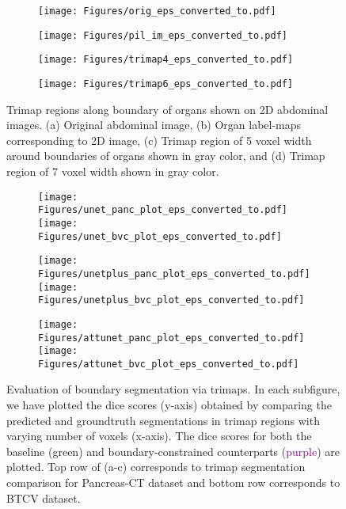 \documentclass[final,5p,times,twocolumn]{elsarticle}
\begin{document}
\begin{figure}[!hbt]
\begin{subfigure}[b]{.23\textwidth}
\texttt{[image: Figures/orig\_eps\_converted\_to.pdf]} 
\caption{}
\label{fig:origtrimap}
\end{subfigure}
\begin{subfigure}[b]{.23\textwidth}
\texttt{[image: Figures/pil\_im\_eps\_converted\_to.pdf]}
\caption{}
\label{fig:labelmap}
\end{subfigure}
\begin{subfigure}[b]{.23\textwidth}
\texttt{[image: Figures/trimap4\_eps\_converted\_to.pdf]}
\caption{}
\label{fig:trmap4}
\end{subfigure}
\begin{subfigure}[b]{.23\textwidth}
\texttt{[image: Figures/trimap6\_eps\_converted\_to.pdf]}
\caption{}
\label{fig:trmap6}
\end{subfigure}
\caption{Trimap regions along boundary of organs shown on 2D abdominal images. (a) Original abdominal image, (b) Organ label-maps corresponding to 2D image, (c) Trimap region of 5 voxel width around boundaries of organs shown in gray color, and (d) Trimap region of 7 voxel width shown in gray color.
}\label{fig:trimap}
\end{figure}
\begin{figure}[ht]
\begin{subfigure}{.28\textwidth}
\texttt{[image: Figures/unet\_panc\_plot\_eps\_converted\_to.pdf]}
\hfill
\texttt{[image: Figures/unet\_bvc\_plot\_eps\_converted\_to.pdf]}
\caption{}
\end{subfigure}
\hspace*{\fill}
\begin{subfigure}{.28\textwidth}
\texttt{[image: Figures/unetplus\_panc\_plot\_eps\_converted\_to.pdf]}
\hfill
\texttt{[image: Figures/unetplus\_bvc\_plot\_eps\_converted\_to.pdf]}
\caption{}
\end{subfigure}
\hspace*{\fill}
\begin{subfigure}{.28\textwidth}
\texttt{[image: Figures/attunet\_panc\_plot\_eps\_converted\_to.pdf]}
\hfill
\texttt{[image: Figures/attunet\_bvc\_plot\_eps\_converted\_to.pdf]}
\caption{}
\end{subfigure}
\hspace*{\fill}
\caption{Evaluation of boundary segmentation via trimaps. In each subfigure, we have plotted the dice scores (y-axis) obtained by comparing the predicted and groundtruth segmentations in trimap regions with varying number of voxels (x-axis). The dice scores for both the baseline (\textcolor{st}{green}) and boundary-constrained counterparts (\textcolor{Purple}{purple}) are plotted. Top row of (a-c) corresponds to trimap segmentation comparison for Pancreas-CT dataset and bottom row corresponds to BTCV dataset.}
\label{fig:tri}
\end{figure}
\end{document}
